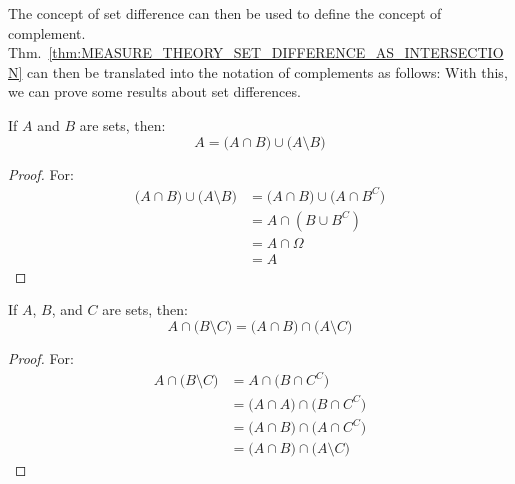         The concept of set difference can then be used to define the
        concept of complement.
        Thm.~\ref{thm:MEASURE_THEORY_SET_DIFFERENCE_AS_INTERSECTION} can then
        be translated into the notation of complements as follows:
        With this, we can prove some results about set differences.
        \begin{theorem}
            If $A$ and $B$ are sets, then:
            \begin{equation}
                A=\big(A\cap{B}\big)\cup\big(A\setminus{B}\big)
            \end{equation}
        \end{theorem}
        \begin{proof}
            For:
            \begin{subequations}
                \begin{align}
                    \big(A\cap{B})\cup\big(A\setminus{B}\big)
                    &=\big(A\cap{B}\big)\cup\big(A\cap{B}^{C}\big)\\
                    &=A\cap(B\cup{B}^{C})\\
                    &=A\cap\Omega\\
                    &=A
                \end{align}
            \end{subequations}
        \end{proof}
        \begin{theorem}
            If $A$, $B$, and $C$ are sets, then:
            \begin{equation}
                A\cap\big(B\setminus{C}\big)
                =\big(A\cap{B}\big)\cap\big(A\setminus{C}\big)
            \end{equation}
        \end{theorem}
        \begin{proof}
            For:
            \begin{subequations}
                \begin{align}
                    A\cap\big(B\setminus{C}\big)
                    &=A\cap\big(B\cap{C}^{C}\big)\\
                    &=\big(A\cap{A}\big)\cap\big(B\cap{C}^{C}\big)\\
                    &=\big(A\cap{B}\big)\cap\big(A\cap{C}^{C}\big)\\
                    &=\big(A\cap{B}\big)\cap\big(A\setminus{C}\big)
                \end{align}
            \end{subequations}
        \end{proof}
